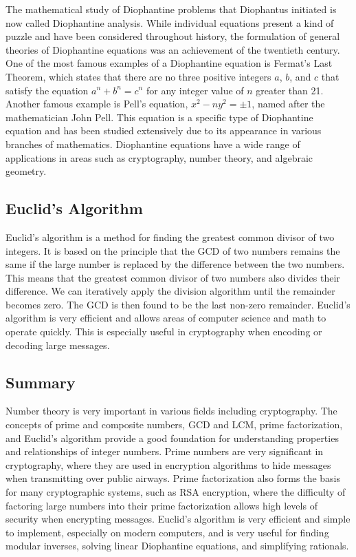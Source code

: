 \documentclass{article}
\renewcommand{\_}{\ifincsname_\else\legacyunderscore\fi}
\begin{document}
    
    The mathematical study of Diophantine problems that Diophantus initiated is now called Diophantine analysis. While individual equations present a kind of puzzle and have been considered throughout history, the formulation of general theories of Diophantine equations was an achievement of the twentieth century. One of the most famous examples of a Diophantine equation is Fermat’s Last Theorem, which states that there are no three positive integers $a$, $b$, and $c$ that satisfy the equation $a^n + b^n = c^n$ for any integer value of $n$ greater than 21. Another famous example is Pell’s equation, $x^2 - ny^2 = \pm1$, named after the mathematician John Pell. This equation is a specific type of Diophantine equation and has been studied extensively due to its appearance in various branches of mathematics. Diophantine equations have a wide range of applications in areas such as cryptography, number theory, and algebraic geometry.

    \subsection{Euclid's Algorithm}
    Euclid's algorithm is a method for finding the greatest common divisor of two integers. It is based on the principle that the GCD of two numbers remains the same if the large number is replaced by the difference between the two numbers. This means that the greatest common divisor of two numbers also divides their difference. We can iteratively apply the division algorithm until the remainder becomes zero. The GCD is then found to be the last non-zero remainder. Euclid's algorithm is very efficient and allows areas of computer science and math to operate quickly. This is especially useful in cryptography when encoding or decoding large messages. 

    \subsection{Summary}
    Number theory is very important in various fields including cryptography. The concepts of prime and composite numbers, GCD and LCM, prime factorization, and Euclid's algorithm provide a good foundation for understanding properties and relationships of integer numbers. Prime numbers are very significant in cryptography, where they are used in encryption algorithms to hide messages when transmitting over public airways. Prime factorization also forms the basis for many cryptographic systems, such as RSA encryption, where the difficulty of factoring large numbers into their prime factorization allows high levels of security when encrypting messages. Euclid's algorithm is very efficient and simple to implement, especially on modern computers, and is very useful for finding modular inverses, solving linear Diophantine equations, and simplifying rationals. 
\newpage
\end{document}
